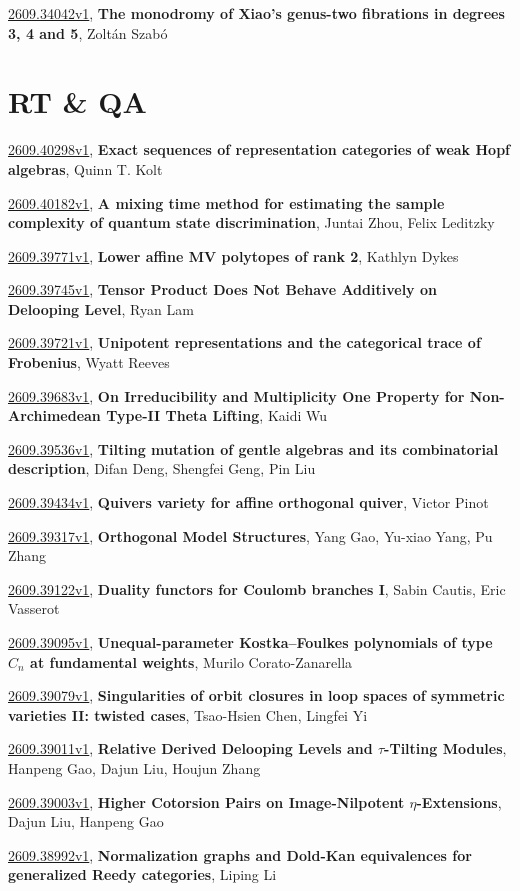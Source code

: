 \documentclass[9pt, a4paper]{article}
\theoremstyle{plain}
\theoremstyle{definition}
\theoremstyle{remark}
\newcommand{\arxiv}[3]{\href{https://arxiv.org/abs/#1}{#1}, \textbf{\textcolor{arxivblue}{#2}}, #3}
\begin{document}
\arxiv{2609.34042v1}{The monodromy of Xiao's genus-two fibrations in degrees 3, 4 and 5}{Zoltán Szabó}


\section{RT \& QA}
\arxiv{2609.40298v1}{Exact sequences of representation categories of weak Hopf algebras}{Quinn T. Kolt}

\arxiv{2609.40182v1}{A mixing time method for estimating the sample complexity of quantum state discrimination}{Juntai Zhou, Felix Leditzky}

\arxiv{2609.39771v1}{Lower affine MV polytopes of rank 2}{Kathlyn Dykes}

\arxiv{2609.39745v1}{Tensor Product Does Not Behave Additively on Delooping Level}{Ryan Lam}

\arxiv{2609.39721v1}{Unipotent representations and the categorical trace of Frobenius}{Wyatt Reeves}

\arxiv{2609.39683v1}{On Irreducibility and Multiplicity One Property for Non-Archimedean Type-II Theta Lifting}{Kaidi Wu}

\arxiv{2609.39536v1}{Tilting mutation of gentle algebras and its combinatorial description}{Difan Deng, Shengfei Geng, Pin Liu}

\arxiv{2609.39434v1}{Quivers variety for affine orthogonal quiver}{Victor Pinot}

\arxiv{2609.39317v1}{Orthogonal Model Structures}{Yang Gao, Yu-xiao Yang, Pu Zhang}

\arxiv{2609.39122v1}{Duality functors for Coulomb branches I}{Sabin Cautis, Eric Vasserot}

\arxiv{2609.39095v1}{Unequal-parameter Kostka--Foulkes polynomials of type $C_n$ at fundamental weights}{Murilo Corato-Zanarella}

\arxiv{2609.39079v1}{Singularities of orbit closures in loop spaces of symmetric varieties II: twisted cases}{Tsao-Hsien Chen, Lingfei Yi}

\arxiv{2609.39011v1}{Relative Derived Delooping Levels and $τ$-Tilting Modules}{Hanpeng Gao, Dajun Liu, Houjun Zhang}

\arxiv{2609.39003v1}{Higher Cotorsion Pairs on Image-Nilpotent \(η\)-Extensions}{Dajun Liu, Hanpeng Gao}

\arxiv{2609.38992v1}{Normalization graphs and Dold-Kan equivalences for generalized Reedy categories}{Liping Li}
\end{document}
